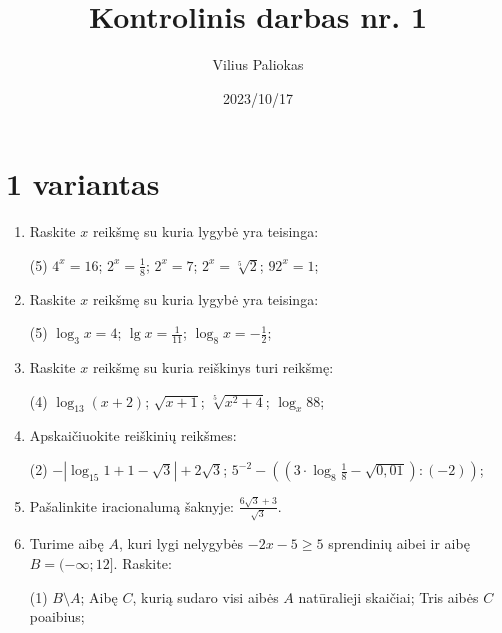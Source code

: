 \documentclass[a4paper]{article}
\title{Kontrolinis darbas nr. 1}
\author{Vilius Paliokas}
\date{2023/10/17}
\begin{document}
\thispagestyle{empty}
\section*{1 variantas}

\begin{enumerate}
      \item Raskite $x$ reikšmę su kuria lygybė yra teisinga:

            \begin{tasks}[item-format={\normalfont}, after-item-skip=4mm](5)
                  \task $4^{x}=16$;
                  \task $2^{x}=\frac{1}{8}$;
                  \task $2^{x}=7$;
                  \task $2^{x}=\sqrt[5]{2}$;
                  \task $92^{x}=1$;
            \end{tasks}

      \item Raskite $x$  reikšmę su kuria lygybė yra teisinga:
            \begin{tasks}[item-format={\normalfont}, after-item-skip=4mm](5)
                  \task $\log_{3} x=4$;
                  \task $\lg x=\frac{1}{11}$;
                  \task $\log_{8} x=-\frac{1}{2}$;
            \end{tasks}
      \item Raskite $x$  reikšmę su kuria reiškinys turi reikšmę:
            \begin{tasks}[item-format={\normalfont}, after-item-skip=4mm](4)
                  \task $\log_{13} (x+2)$;
                  \task $\sqrt{x+1}$;
                  \task $\sqrt[5]{x^{2}+4}$;
                  \task $\log_{x}88$;
            \end{tasks}
      \item Apskaičiuokite reiškinių reikšmes:
            \begin{tasks}[item-format={\normalfont}, after-item-skip=4mm](2)
                  \task $-\left|\log_{15}1+1-\sqrt{3}\right|+2\sqrt{3}$;
                  \task $5^{-2} - ((3 \cdot
                        \log_{8}\frac{1}{8}-\sqrt{0,01}):(-2))$;
            \end{tasks}

      \item Pašalinkite iracionalumą šaknyje: $\frac{6\sqrt{3}+3}{\sqrt{3}}$.

      \item Turime aibę $A$, kuri lygi nelygybės $-2x-5\geq5$ sprendinių aibei
            ir aibę $B=(-\infty;12]$. Raskite:
            \begin{tasks}[item-format={\normalfont}, after-item-skip=2mm](1)
                  \task $B \setminus A$;
                  \task Aibę $C$, kurią sudaro visi aibės $A$ natūralieji
                  skaičiai;
                  \task Tris aibės $C$ poaibius;
            \end{tasks}
\end{enumerate}
\end{document}
